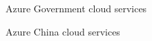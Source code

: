 \begin{flashcard}[Understand]{Azure Government cloud services}

\end{flashcard}

\begin{flashcard}[Describe]{Azure China cloud services}

\end{flashcard}
